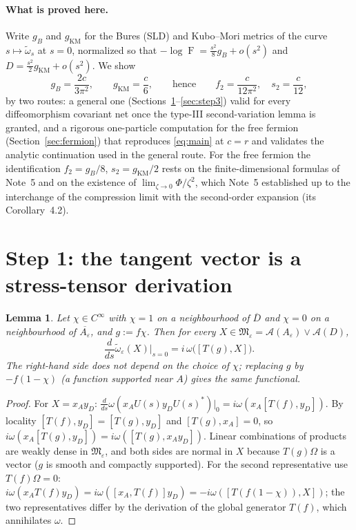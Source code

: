 \documentclass[11pt]{article}
\theoremstyle{accent}
\newtheorem{lemma}[theorem]{Lemma}
\theoremstyle{definition}
\newcommand{\cA}{\mathcal{A}}
\newcommand{\cM}{\mathfrak{M}}
\newcommand{\eps}{\varepsilon}
\newcommand{\Fid}{\operatorname{F}}
\begin{document}
\paragraph{What is proved here.}
Write \(g_B\) and \(g_{\mathrm{KM}}\) for the Bures (SLD) and Kubo--Mori metrics of the curve \(s\mapsto\widetilde\omega_s\) at \(s=0\), normalized so that \(-\log\Fid=\frac{s^2}{8}g_B+o(s^2)\) and \(D=\frac{s^2}{2}g_{\mathrm{KM}}+o(s^2)\).  We show
\begin{equation}\label{eq:main}
 \boxed{\;g_B=\frac{2c}{3\pi^2},\qquad g_{\mathrm{KM}}=\frac c6,\qquad\text{hence}\qquad f_2=\frac{c}{12\pi^2},\quad s_2=\frac c{12},\;}
\end{equation}
by two routes: a general one (Sections~\ref{sec:step1}--\ref{sec:step3}) valid for every diffeomorphism covariant net once the type-III second-variation lemma is granted, and a rigorous one-particle computation for the free fermion (Section~\ref{sec:fermion}) that reproduces \eqref{eq:main} at \(c=r\) and validates the analytic continuation used in the general route.  For the free fermion the identification \(f_2=g_B/8\), \(s_2=g_{\mathrm{KM}}/2\) rests on the finite-dimensional formulas of Note~5 and on the existence of \(\lim_{\zeta\to0}\Phi/\zeta^2\), which Note~5 established up to the interchange of the compression limit with the second-order expansion (its Corollary~4.2).
\section{Step 1: the tangent vector is a stress-tensor derivation}\label{sec:step1}

\begin{lemma}\label{lem:tangent}
Let \(\chi\in C^\infty\) with \(\chi=1\) on a neighbourhood of \(\overline D\) and \(\chi=0\) on a neighbourhood of \(\overline{A_\eps}\), and \(g:=f\chi\).  Then for every \(X\in\cM_\eps=\cA(A_\eps)\vee\cA(D)\),
\begin{equation}\label{eq:tangent}
 \frac{d}{ds}\widetilde\omega_\eps(X)\Big|_{s=0}=i\,\omega\bigl([T(g),X]\bigr).
\end{equation}
The right-hand side does not depend on the choice of \(\chi\); replacing \(g\) by \(-f(1-\chi)\) (a function supported near \(A\)) gives the same functional.
\end{lemma}

\begin{proof}
For \(X=x_Ay_D\): \(\frac{d}{ds}\omega(x_AU(s)y_DU(s)^*)|_0=i\omega(x_A[T(f),y_D])\).  By locality \([T(f),y_D]=[T(g),y_D]\) and \([T(g),x_A]=0\), so \(i\omega(x_A[T(g),y_D])=i\omega([T(g),x_Ay_D])\).  Linear combinations of products are weakly dense in \(\cM_\eps\), and both sides are normal in \(X\) because \(T(g)\Omega\) is a vector (\(g\) is smooth and compactly supported).  For the second representative use \(T(f)\Omega=0\): \(i\omega(x_AT(f)y_D)=i\omega([x_A,T(f)]y_D)=-i\omega([T(f(1-\chi)),X])\); the two representatives differ by the derivation of the global generator \(T(f)\), which annihilates \(\omega\).
\end{proof}
\end{document}
